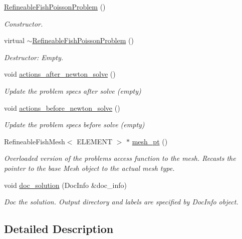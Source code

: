 \begin{DoxyCompactItemize}
\hyperlink{classRefineableFishPoissonProblem_a7a9c8258a867de6b3c8b9d00a7c965f1}{Refineable\+Fish\+Poisson\+Problem} ()
\begin{DoxyCompactList}\small\item\em Constructor. \end{DoxyCompactList}\item 
virtual \hyperlink{classRefineableFishPoissonProblem_a4a5e7c5f264364211ad641353933c222}{$\sim$\+Refineable\+Fish\+Poisson\+Problem} ()
\begin{DoxyCompactList}\small\item\em Destructor\+: Empty. \end{DoxyCompactList}\item 
void \hyperlink{classRefineableFishPoissonProblem_a7f6c356f7c8bd0130de957297e999f40}{actions\+\_\+after\+\_\+newton\+\_\+solve} ()
\begin{DoxyCompactList}\small\item\em Update the problem specs after solve (empty) \end{DoxyCompactList}\item 
void \hyperlink{classRefineableFishPoissonProblem_a58098181f3b88c2fc65f24fb15c1a529}{actions\+\_\+before\+\_\+newton\+\_\+solve} ()
\begin{DoxyCompactList}\small\item\em Update the problem specs before solve (empty) \end{DoxyCompactList}\item 
Refineable\+Fish\+Mesh$<$ E\+L\+E\+M\+E\+NT $>$ $\ast$ \hyperlink{classRefineableFishPoissonProblem_a803c9050b07b35aba22f08a5a9e59f2c}{mesh\+\_\+pt} ()
\begin{DoxyCompactList}\small\item\em Overloaded version of the problem\textquotesingle{}s access function to the mesh. Recasts the pointer to the base Mesh object to the actual mesh type. \end{DoxyCompactList}\item 
void \hyperlink{classRefineableFishPoissonProblem_aeee1bf23216971b50b8822c45e62c48b}{doc\+\_\+solution} (Doc\+Info \&doc\+\_\+info)
\begin{DoxyCompactList}\small\item\em Doc the solution. Output directory and labels are specified by Doc\+Info object. \end{DoxyCompactList}\end{DoxyCompactItemize}


\subsection{Detailed Description}
